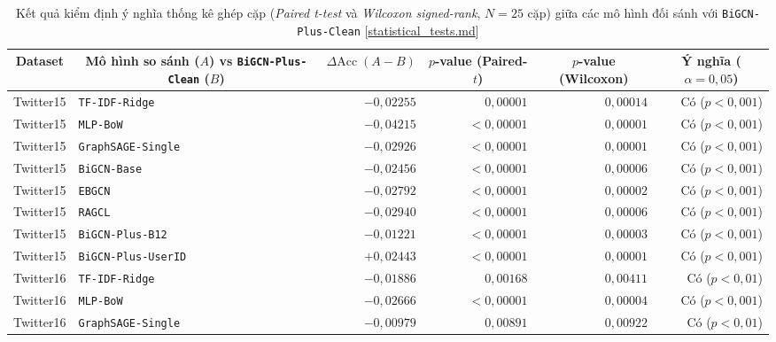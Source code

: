 \documentclass[11pt,a4paper]{extreport}
\newcommand{\ghrepo}{https://github.com/pqui-345/BiGCN-Plus-Rumor-Detection/blob/main}
\newcommand{\coderef}[2]{\textnormal{[\href{\ghrepo/#1}{#2}]}}
\begin{document}
\begin{table}[htbp]
    \centering
    \caption[Kiểm định thống kê Paired t-test và Wilcoxon đối với BiGCN-Plus-Clean]{Kết quả kiểm định ý nghĩa thống kê ghép cặp (\textit{Paired t-test} và \textit{Wilcoxon signed-rank}, $N = 25$ cặp) giữa các mô hình đối sánh với \texttt{BiGCN-Plus-Clean} \coderef{results/tables/statistical_tests.md}{statistical\_tests.md}}
    \label{tab:wilcoxon-tests}
    \footnotesize
    \setlength{\tabcolsep}{4.5pt}
    \begin{tabular}{@{}llrrrr@{}}
        \toprule
        \multicolumn{1}{c}{\textbf{Dataset}} & \multicolumn{1}{c}{\textbf{Mô hình so sánh ($A$) vs \texttt{BiGCN-Plus-Clean} ($B$)}} & \multicolumn{1}{c}{\textbf{$\Delta\text{Acc}\;(A-B)$}} & \multicolumn{1}{c}{\textbf{$p$-value (Paired-$t$)}} & \multicolumn{1}{c}{\textbf{$p$-value (Wilcoxon)}} & \multicolumn{1}{c}{\textbf{Ý nghĩa ($\alpha = 0{,}05$)}} \\
        \midrule
        Twitter15 & \texttt{TF-IDF-Ridge}      & $-0{,}02255$ & $0{,}00001$ & $0{,}00014$ & Có ($p < 0{,}001$) \\
        Twitter15 & \texttt{MLP-BoW}           & $-0{,}04215$ & $< 0{,}00001$ & $0{,}00001$ & Có ($p < 0{,}001$) \\
        Twitter15 & \texttt{GraphSAGE-Single}  & $-0{,}02926$ & $< 0{,}00001$ & $0{,}00001$ & Có ($p < 0{,}001$) \\
        Twitter15 & \texttt{BiGCN-Base}        & $-0{,}02456$ & $< 0{,}00001$ & $0{,}00006$ & Có ($p < 0{,}001$) \\
        Twitter15 & \texttt{EBGCN}             & $-0{,}02792$ & $< 0{,}00001$ & $0{,}00002$ & Có ($p < 0{,}001$) \\
        Twitter15 & \texttt{RAGCL}             & $-0{,}02940$ & $< 0{,}00001$ & $0{,}00006$ & Có ($p < 0{,}001$) \\
        Twitter15 & \texttt{BiGCN-Plus-B12}    & $-0{,}01221$ & $< 0{,}00001$ & $0{,}00003$ & Có ($p < 0{,}001$) \\
        Twitter15 & \texttt{BiGCN-Plus-UserID} & $+0{,}02443$ & $< 0{,}00001$ & $0{,}00001$ & Có ($p < 0{,}001$) \\
        \addlinespace[4pt]
        Twitter16 & \texttt{TF-IDF-Ridge}      & $-0{,}01886$ & $0{,}00168$ & $0{,}00411$ & Có ($p < 0{,}01$) \\
        Twitter16 & \texttt{MLP-BoW}           & $-0{,}02666$ & $< 0{,}00001$ & $0{,}00004$ & Có ($p < 0{,}001$) \\
        Twitter16 & \texttt{GraphSAGE-Single}  & $-0{,}00979$ & $0{,}00891$ & $0{,}00922$ & Có ($p < 0{,}01$) \\

\end{tabular}
\end{table}
\end{document}
